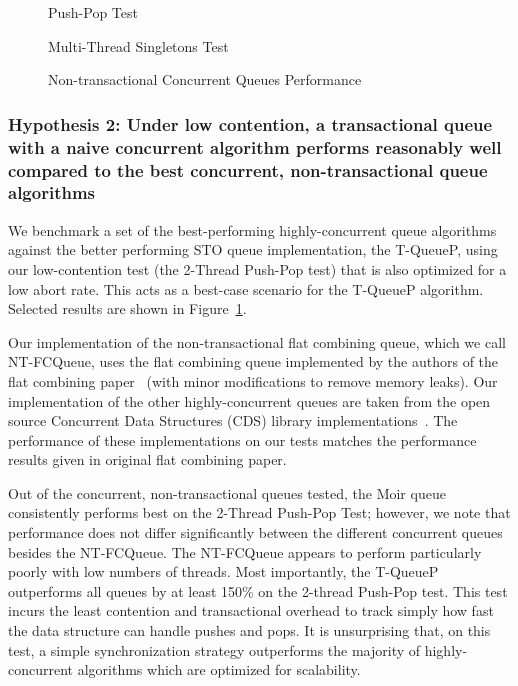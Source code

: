 \begin{figure}[H]
    \centering
	\begin{minipage}{0.75\textwidth}
        \caption*{Push-Pop Test}
        \vspace{12pt}
	\end{minipage}
   	\begin{minipage}{0.75\textwidth}
        \caption*{Multi-Thread Singletons Test}
	\end{minipage}
        \caption{Non-transactional Concurrent Queues Performance}
    \label{fig:ntqs}
\end{figure}

\subsubsection{Hypothesis 2: Under low contention, a transactional queue with a naive concurrent algorithm performs reasonably well compared to the best concurrent, non-transactional queue algorithms}

We benchmark a set of the best-performing highly-concurrent queue algorithms against the better performing STO queue implementation, the T-QueueP, using our low-contention test (the 2-Thread Push-Pop test) that is also optimized for a low abort rate. This acts as a best-case scenario for the T-QueueP algorithm. Selected results are shown in Figure~\ref{fig:ntqs}.

Our implementation of the non-transactional flat combining queue, which we call NT-FCQueue, uses the flat combining queue implemented by the authors of the flat combining paper~\cite{flatcombining} (with minor modifications to remove memory leaks). Our implementation of the other highly-concurrent queues are taken from the open source Concurrent Data Structures (CDS) library implementations~\cite{libcds}. The performance of these implementations on our tests matches the performance results given in original flat combining paper. 

Out of the concurrent, non-transactional queues tested, the Moir queue~\cite{queue2} consistently performs best on the 2-Thread Push-Pop Test; however, we note that performance does not differ significantly between the different concurrent queues besides the NT-FCQueue. The NT-FCQueue appears to perform particularly poorly with low numbers of threads. Most importantly, the T-QueueP outperforms all queues by at least 150\% on the 2-thread Push-Pop test. This test incurs the least contention and transactional overhead to track simply how fast the data structure can handle pushes and pops. It is unsurprising that, on this test, a simple synchronization strategy outperforms the majority of highly-concurrent algorithms which are optimized for scalability. 

